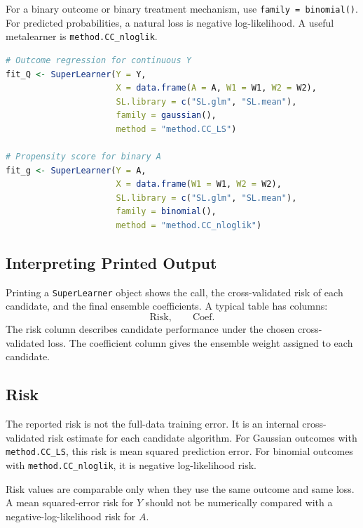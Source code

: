 For a binary outcome or binary treatment mechanism, use \texttt{family = binomial()}.
For predicted probabilities, a natural loss is negative log-likelihood. A useful
metalearner is \texttt{method.CC\_nloglik}.

\begin{implementationbox}
\begin{lstlisting}[language=R]
# Outcome regression for continuous Y
fit_Q <- SuperLearner(Y = Y,
                      X = data.frame(A = A, W1 = W1, W2 = W2),
                      SL.library = c("SL.glm", "SL.mean"),
                      family = gaussian(),
                      method = "method.CC_LS")

# Propensity score for binary A
fit_g <- SuperLearner(Y = A,
                      X = data.frame(W1 = W1, W2 = W2),
                      SL.library = c("SL.glm", "SL.mean"),
                      family = binomial(),
                      method = "method.CC_nloglik")
\end{lstlisting}
\end{implementationbox}

\subsection{Interpreting Printed Output}

Printing a \texttt{SuperLearner} object shows the call, the cross-validated risk of
each candidate, and the final ensemble coefficients. A typical table has columns:
\[
\text{Risk},\qquad \text{Coef}.
\]
The risk column describes candidate performance under the chosen cross-validated
loss. The coefficient column gives the ensemble weight assigned to each candidate.

\subsection{Risk}

The reported risk is not the full-data training error. It is an internal
cross-validated risk estimate for each candidate algorithm. For Gaussian outcomes
with \texttt{method.CC\_LS}, this risk is mean squared prediction error. For binomial
outcomes with \texttt{method.CC\_nloglik}, it is negative log-likelihood risk.

Risk values are comparable only when they use the same outcome and same loss. A
mean squared-error risk for $Y$ should not be numerically compared with a
negative-log-likelihood risk for $A$.

